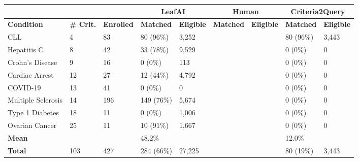 \def\arraystretch{1.4}
\begin{tabular}{m{3cm} m{0.9cm} m{1.5cm} |m{1.7cm} m{1.3cm} |m{1.7cm} m{1.3cm} |m{1.7cm} m{1.3cm}}
     & & & \multicolumn{2}{c}{\textbf{LeafAI}} & \multicolumn{2}{|c|}{\textbf{Human}} & \multicolumn{2}{c}{\textbf{Criteria2Query}}  \\
     \toprule
    \textbf{Condition} & \textbf{\# Crit.} & \textbf{Enrolled} & \textbf{Matched} & \textbf{Eligible} & \textbf{Matched} & \textbf{Eligible} & \textbf{Matched} & \textbf{Eligible} \\
    \midrule
    CLL                & 4 & 83 & 80 (96\%) & 3,252 & & & 80 (96\%) & 3,443 \\
    Hepatitis C        & 8 & 42 & 33 (78\%) & 9,529 & & & 0 (0\%) & 0 \\
    Crohn's Disease    & 9 & 16 & 0 (0\%) & 113 & & & 0 (0\%) & 0 \\
    Cardiac Arrest     & 12 & 27 & 12 (44\%) & 4,792 & & & 0 (0\%) & 0 \\
    COVID-19           & 13 & 41 & 0 (0\%) & 0 & & & 0 (0\%) & 0 \\
    Multiple Sclerosis & 14 & 196 & 149 (76\%) & 5,674 & & & 0 (0\%) & 0 \\
    Type 1 Diabetes    & 18 & 11  & 0 (0\%)      & 1,006 & & & 0 (0\%) & 0 \\
    Ovarian Cancer     & 25 & 11 & 10 (91\%) & 1,667 & & & 0 (0\%) & 0  \\
    \bottomrule
    \textbf{Mean} & & & 48.2\% & & & & 12.0\% &  \\
    \textbf{Total} & 103 & 427 & 284 (66\%) & 27,225 & & & 80 (19\%) & 3,443 \\
\end{tabular}